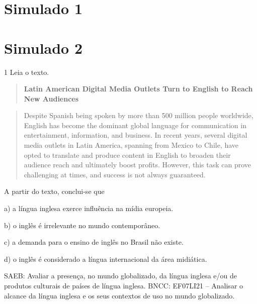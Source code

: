 \section{Simulado 1}\label{simulado-1}



\section{Simulado 2}\label{simulado-2}

\num{1} Leia o texto.

\begin{quote}
\textbf{Latin American Digital Media Outlets Turn to English to Reach
New Audiences}
\end{quote}

\begin{quote}
Despite Spanish being spoken by more than 500 million people worldwide,
English has become the dominant global language for communication in
entertainment, information, and business. In recent years, several
digital media outlets in Latin America, spanning from Mexico to Chile,
have opted to translate and produce content in English to broaden their
audience reach and ultimately boost profits. However, this task can
prove challenging at times, and success is not always guaranteed.
\end{quote}


A partir do texto, conclui-se que

a) a língua inglesa exerce influência na mídia europeia.

b) o inglês é irrelevante no mundo contemporâneo.

c) a demanda para o ensino de inglês no Brasil não existe.

d) o inglês é considerado a língua internacional da área midiática.

SAEB: Avaliar a presença, no mundo globalizado, da língua inglesa e/ou
de produtos culturais de países de língua inglesa. BNCC: EF07LI21 --
Analisar o alcance da língua inglesa e os seus contextos de uso no mundo
globalizado.

